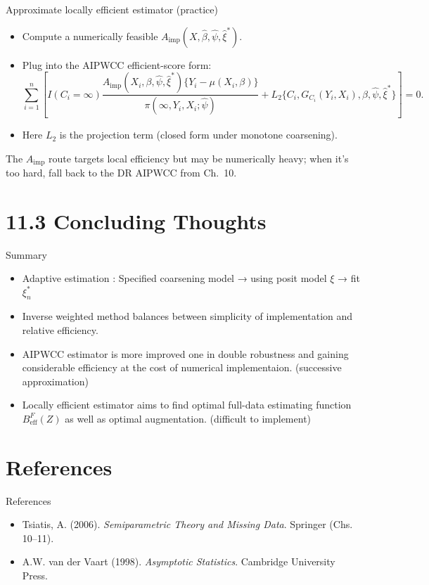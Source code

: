 \documentclass[xcolor=dvipsnames,aspectratio=169]{beamer}
\newcommand{\1}{\mathbbm{1}}
\begin{document}
\begin{frame}{Approximate locally efficient estimator (practice)}
  \begin{itemize}
    \item Compute a numerically feasible $A_{\text{imp}}(X,\hat\beta,\hat\psi,\hat\xi^\ast)$.
    \item Plug into the AIPWCC efficient-score form:
    \[
      \sum_{i=1}^n\left[
        I(C_i=\infty)\frac{A_{\text{imp}}(X_i,\beta,\hat\psi,\hat\xi^\ast)\{Y_i-\mu(X_i,\beta)\}}{\pi(\infty,Y_i,X_i;\hat\psi)}
        +L_2\{C_i,G_{C_i}(Y_i,X_i),\beta,\hat\psi,\hat\xi^\ast\}
      \right]=0.
    \]
    \item Here $L_2$ is the projection term (closed form under monotone coarsening).
  \end{itemize}
  \vspace{2mm}
  \begin{tcolorbox}[title=Robustness note]
  The $A_{\text{imp}}$ route targets local efficiency but may be numerically heavy; when it’s too hard, fall back to the DR AIPWCC from Ch.~10.
  \end{tcolorbox}
\end{frame}

\section{11.3 Concluding Thoughts}

\begin{frame}{Summary}
  \begin{itemize}
    \item Adaptive estimation : Specified coarsening model → using posit model $\xi$ → fit $\xi_n^*$ 
    \item Inverse weighted method balances between simplicity of implementation and relative efficiency.
    \item AIPWCC estimator is more improved one in double robustness and gaining considerable efficiency at the cost of numerical implementaion. (successive approximation)
    \item Locally efficient estimator aims to find optimal full-data estimating function $B_{\text{eff}}^F(Z)$ as well as optimal augmentation. (difficult to implement) 
  \end{itemize}
\end{frame}

\section*{References}

\begin{frame}{References}
  \begin{itemize}
    \item Tsiatis, A. (2006). \emph{Semiparametric Theory and Missing Data}. Springer (Chs. 10–11).
    \item A.W. van der Vaart (1998). \emph{Asymptotic Statistics}. Cambridge University Press.
  \end{itemize}
\end{frame}
\end{document}
